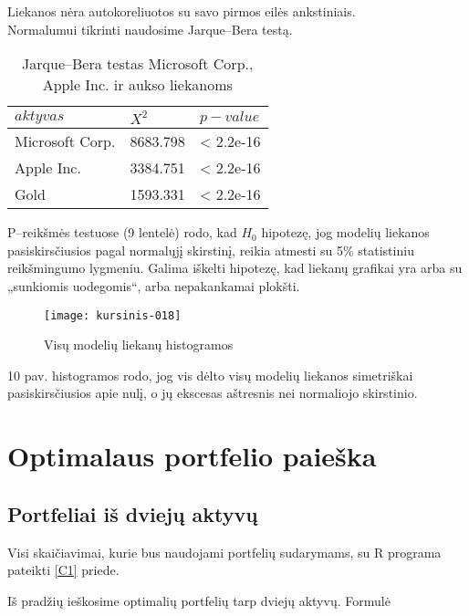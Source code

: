 \documentclass[12pt, a14paper, lithuanian]{article}
\begin{document}
Liekanos nėra autokoreliuotos su savo pirmos eilės ankstiniais.\\

Normalumui tikrinti naudosime Jarque--Bera testą.



\begin{table}[ht]
\begin{center}
    \begin{tabular}{ | l | l | l | }
    \hline
    $ aktyvas $ &  $ X^2 $  & $ p-value $  \\
    \hline
	Microsoft Corp. & 8683.798 & < 2.2e-16\\
	Apple Inc. & 3384.751 & < 2.2e-16\\
	Gold & 1593.331 & < 2.2e-16\\
	\hline
    \end{tabular}
\end{center}
\caption{Jarque--Bera testas Microsoft Corp., Apple Inc. ir aukso liekanoms}
\end{table}

P--reikšmės testuose (9 lentelė) rodo, kad $H_0$ hipotezę, jog modelių liekanos pasiskirsčiusios pagal normalųjį skirstinį, reikia atmesti su 5\% statistiniu reikšmingumo lygmeniu. Galima iškelti hipotezę, kad liekanų grafikai yra arba su „sunkiomis uodegomis“, arba nepakankamai plokšti. 

\begin{figure}[H]
  \centering
\texttt{[image: kursinis-018]}
  \caption{Visų modelių liekanų histogramos}
  \label{fig:10}
\end{figure}

10 pav. histogramos rodo, jog vis dėlto visų modelių liekanos simetriškai pasiskirsčiusios apie nulį, o jų ekscesas aštresnis nei normaliojo skirstinio.




\newpage
\section{Optimalaus portfelio paieška}   


\subsection{Portfeliai iš dviejų aktyvų}

Visi skaičiavimai, kurie bus naudojami portfelių sudarymams, su R programa pateikti \ref{C1} priede.
 
Iš pradžių ieškosime optimalių portfelių tarp dviejų aktyvų. Formulė
\end{document}
